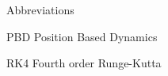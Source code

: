 
\begin{dictionary}{Abbreviations}
\item[PBD]	Position Based Dynamics
\item[RK4]	Fourth order Runge-Kutta
\end{dictionary}
